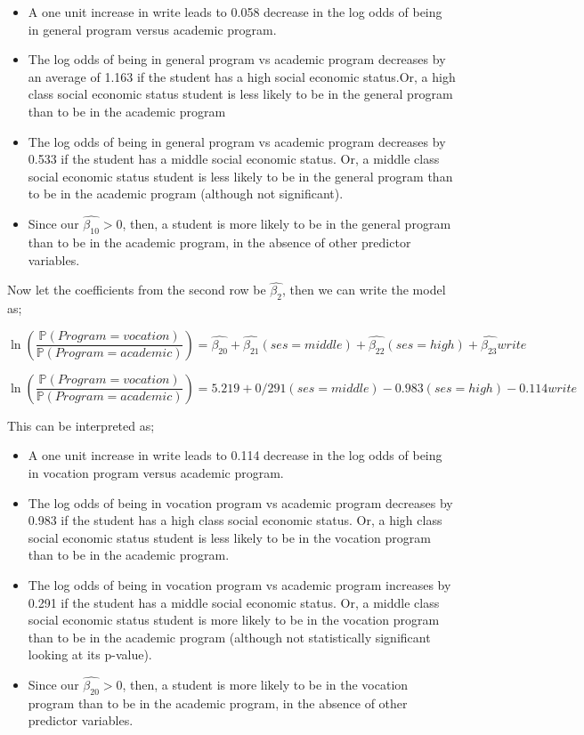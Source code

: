 \documentclass[
]{article}
\begin{document}
\begin{itemize}
\item
  A one unit increase in write leads to 0.058 decrease in the log odds
  of being in general program versus academic program.
\item
  The log odds of being in general program vs academic program decreases
  by an average of 1.163 if the student has a high social economic
  status.Or, a high class social economic status student is less likely
  to be in the general program than to be in the academic program
\item
  The log odds of being in general program vs academic program decreases
  by 0.533 if the student has a middle social economic status. Or, a
  middle class social economic status student is less likely to be in
  the general program than to be in the academic program (although not
  significant).
\item
  Since our \(\hat{\beta_{10}}>0\), then, a student is more likely to be
  in the general program than to be in the academic program, in the
  absence of other predictor variables.
\end{itemize}

Now let the coefficients from the second row be \(\hat{\beta_2}\), then
we can write the model as;

\[\ln(\frac{\mathbb{P}(Program=vocation)}{\mathbb{P}(Program=academic)})=\hat{\beta_{20}}+\hat{\beta_{21}}(ses=middle)+\hat{\beta_{22}}(ses=high)+\hat{\beta_{23}}write\]

\[\ln(\frac{\mathbb{P}(Program=vocation)}{\mathbb{P}(Program=academic)})=5.219+0/291(ses=middle)-0.983(ses=high)-0.114write\]

This can be interpreted as;

\begin{itemize}
\item
  A one unit increase in write leads to 0.114 decrease in the log odds
  of being in vocation program versus academic program.
\item
  The log odds of being in vocation program vs academic program
  decreases by 0.983 if the student has a high class social economic
  status. Or, a high class social economic status student is less likely
  to be in the vocation program than to be in the academic program.
\item
  The log odds of being in vocation program vs academic program
  increases by 0.291 if the student has a middle social economic status.
  Or, a middle class social economic status student is more likely to be
  in the vocation program than to be in the academic program (although
  not statistically significant looking at its p-value).
\item
  Since our \(\hat{\beta_{20}}>0\), then, a student is more likely to be
  in the vocation program than to be in the academic program, in the
  absence of other predictor variables.
\end{itemize}
\end{document}
